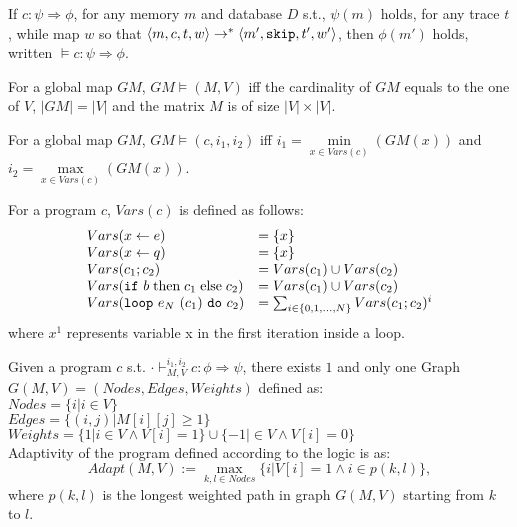 \documentclass[a4paper,11pt]{article}
\begin{document}
\begin{defn}
If $ c : \psi \Rightarrow \phi$, for any memory $m$ and database $D$ s.t., $\psi(m)$ holds, for any trace $t$, while map $w$ so that $ \langle m, c, t,w \rangle \rightarrow^{*} \langle m', \mathtt{skip}, t', w' \rangle$, then $\phi(m')$ holds, written $\vDash c : \psi \Rightarrow \phi $.  
\end{defn}

\begin{defn}
For a global map $GM$, $GM \vDash (M,V)$ iff the cardinality of $GM$ equals to the one of $V$, $|GM| = |V|$ and the matrix $M$ is of size $|V| \times |V|$.
\end{defn}

\begin{defn}
For a global map $GM$, $GM \vDash (c,i_1,i_2)$ iff $i_1= \underset{x \in Vars(c)}{\min}(GM(x))$ and $i_2= \underset{x \in Vars(c)}{\max}(GM(x))$.
\end{defn}

\begin{defn}[Vars]
For a program $c$, $Vars(c)$ is defined as follows:
\[
\begin{array}{ll}
 Vars( \mathrel{ x \leftarrow e })     & = \{ x \}  \\
 Vars( \mathrel{ x \leftarrow q })     & = \{ x \} \\
 Vars( c_1; c_2)     & =  Vars( c_1) \cup Vars(c_2) \\
  Vars( \mathtt{if} ~ b \mbox{\;then\;} c_1 \mbox{\;else\;} c_2)     & =  Vars( c_1) \cup Vars(c_2) \\
  Vars( \mathtt{loop} ~ e_N ~ (c_1) ~ \mathtt{do} ~ c_2 )     & =  \sum_{i \in \{ 0,1, \dots, N \} } Vars(c_1;c_2)^{i} \\
\end{array}
\]
where $x^{1}$ represents variable x in the first iteration inside a loop. 
\end{defn}

\begin{defn}
[Adapt]
Given a program $c$ s.t. $\cdot \vdash_{M,V}^{i_1, i_2} c: \phi \Rightarrow \psi$, there exists $1$ and only one Graph $G(M, V) = (Nodes, Edges, Weights)$ defined as:
\\
$Nodes = \{i | i \in V\}$
\\
$Edges = \{ (i, j) | M[i][j] \geq 1 \}$
\\
$ Weights = \{ 1 | i \in V \land V[i] = 1\}
        \cup \{ -1 | \in V \land V[i] = 0\}$
\\
Adaptivity of the program defined according to the logic is as:
\[
Adapt(M, V) := \max_{k, l \in Nodes}\{i | V[i] = 1 \land i \in p(k, l) \},
\]
where $p(k, l)$ is the longest weighted path in graph $G(M, V)$ starting from $k$ to $l$.
\end{defn}
%
%
\end{document}
